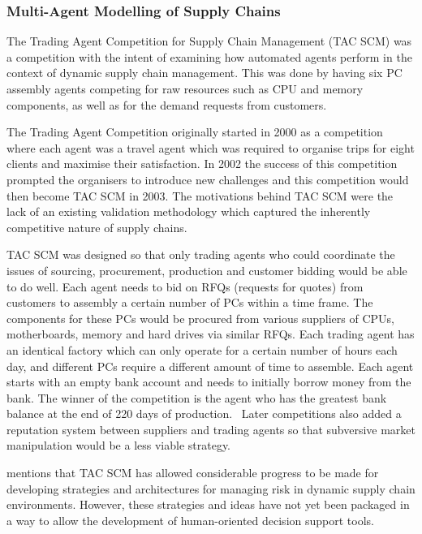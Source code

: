\subsubsection{Multi-Agent Modelling of Supply Chains}

The Trading Agent Competition for Supply Chain Management (TAC SCM) was a competition with the intent of examining how automated agents perform in the context of dynamic supply chain management.
This was done by having six PC assembly agents competing for raw resources such as CPU and memory components, as well as for the demand requests from customers.~\cite{sadeh2003tac}

The Trading Agent Competition originally started in 2000 as a competition where each agent was a travel agent which was required to organise trips for eight clients and maximise their satisfaction.
In 2002 the success of this competition prompted the organisers to introduce new challenges and this competition would then become TAC SCM in 2003.
The motivations behind TAC SCM were the lack of an existing validation methodology which captured the inherently competitive nature of supply chains.~\cite{arunachalam2005supply}

TAC SCM was designed so that only trading agents who could coordinate the issues of sourcing, procurement, production and customer bidding would be able to do well.
Each agent needs to bid on RFQs (requests for quotes) from customers to assembly a certain number of PCs within a time frame.
The components for these PCs would be procured from various suppliers of CPUs, motherboards, memory and hard drives via similar RFQs.
Each trading agent has an identical factory which can only operate for a certain number of hours each day, and different PCs require a different amount of time to assemble.
Each agent starts with an empty bank account and needs to initially borrow money from the bank.
The winner of the competition is the agent who has the greatest bank balance at the end of 220 days of production.~\cite{arunachalam2005supply}
Later competitions also added a reputation system between suppliers and trading agents so that subversive market manipulation would be a less viable strategy.~\cite{collins2010pushing}

 mentions that TAC SCM has allowed considerable pro\-gress to be made for developing strategies and architectures for managing risk in dynamic supply chain environments.
However, these strategies and ideas have not yet been packaged in a way to allow the development of human-oriented decision support tools.

